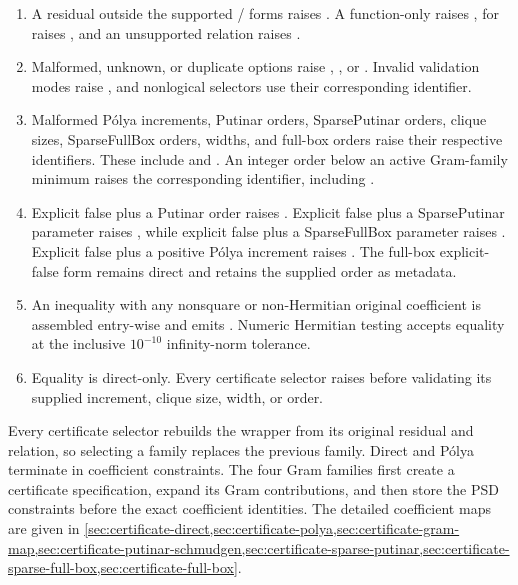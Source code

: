 \remarkshead
\begin{enumerate}[leftmargin=*,itemsep=0.55\baselineskip]
  \item A residual outside the supported / forms raises . A function-only  raises ,  for  raises , and an unsupported relation raises .
  \item Malformed, unknown, or duplicate options raise , , or . Invalid validation modes raise , and nonlogical selectors use their corresponding  identifier.
  \item Malformed P\'olya increments, Putinar orders, SparsePutinar orders, clique sizes, SparseFullBox orders, widths, and full-box orders raise their respective  identifiers. These include  and . An integer order below an active Gram-family minimum raises the corresponding  identifier, including .
  \item Explicit false plus a Putinar order raises . Explicit false plus a SparsePutinar parameter raises , while explicit false plus a SparseFullBox parameter raises . Explicit false plus a positive P\'olya increment raises . The full-box explicit-false form remains direct and retains the supplied order as metadata.
  \item An inequality with any nonsquare or non-Hermitian original coefficient is assembled entry-wise and emits . Numeric Hermitian testing accepts equality at the inclusive $10^{-10}$ infinity-norm tolerance.
  \item Equality is direct-only. Every certificate selector raises\newline {}\allowbreak{} before validating its supplied increment, clique size, width, or order.
\end{enumerate}

Every certificate selector rebuilds the wrapper from its original residual and relation, so selecting a family replaces the previous family. Direct and P\'olya terminate in coefficient constraints. The four Gram families first create a certificate specification, expand its Gram contributions, and then store the PSD constraints before the exact coefficient identities. The detailed coefficient maps are given in \cref{sec:certificate-direct,sec:certificate-polya,sec:certificate-gram-map,sec:certificate-putinar-schmudgen,sec:certificate-sparse-putinar,sec:certificate-sparse-full-box,sec:certificate-full-box}.

